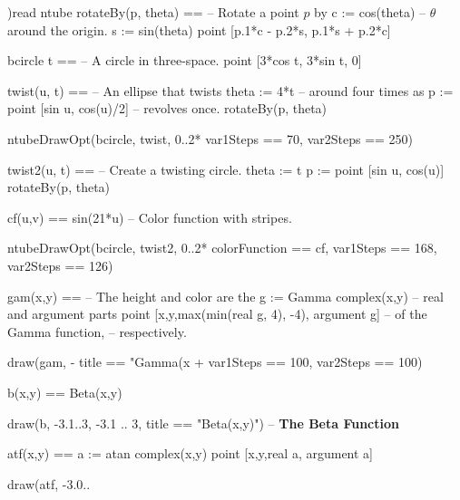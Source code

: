 \begin{xmpLinesNoResetPlain}
)read ntube
rotateBy(p, theta) ==                                    -- Rotate a point $p$ by
  c := cos(theta)                                        -- \quad{}$\theta$ around the origin.
  s := sin(theta)
  point [p.1*c - p.2*s, p.1*s + p.2*c]

bcircle t ==                                             -- A circle in three-space.
  point [3*cos t, 3*sin t, 0]

twist(u, t) ==                                           -- An ellipse that twists
  theta := 4*t                                           -- \quad{}around four times as
  p := point [sin u, cos(u)/2]                           -- \quad{} revolves once.
  rotateBy(p, theta)

ntubeDrawOpt(bcircle, twist, 0..2*%
             var1Steps == 70, var2Steps == 250)

twist2(u, t) ==                                          -- Create a twisting circle.
  theta := t
  p := point [sin u, cos(u)]
  rotateBy(p, theta)

cf(u,v) == sin(21*u)                                     -- Color function with  stripes.

ntubeDrawOpt(bcircle, twist2, 0..2*%
  colorFunction == cf, var1Steps == 168,
  var2Steps == 126)
\end{xmpLinesNoResetPlain}


\begin{xmpLinesPlain}
gam(x,y) ==                                              -- The height and color are the
  g := Gamma complex(x,y)                                -- \quad{}real and argument parts
  point [x,y,max(min(real g, 4), -4), argument g]        -- \quad{}of the Gamma function,
                                                         -- \quad{}respectively.

draw(gam, -%
     title == "Gamma(x + %
     var1Steps == 100, var2Steps == 100)

b(x,y) == Beta(x,y)

draw(b, -3.1..3, -3.1 .. 3, title == "Beta(x,y)")        -- \textbf{The Beta Function}

atf(x,y) ==
  a := atan complex(x,y)
  point [x,y,real a, argument a]

draw(atf, -3.0..%
\end{xmpLinesPlain}


